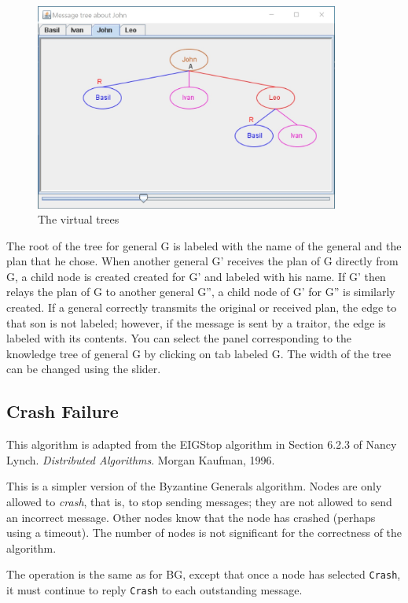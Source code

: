 \documentclass[11pt]{article}
\newcommand{\p}[1]{\texttt{#1}}
\begin{document}
\begin{figure}[htb]
\begin{center}
\includegraphics[width=10cm,keepaspectratio=true]{tree.jpg}
\end{center}
\caption{The virtual trees}\label{fig3}
\end{figure}

The root of the tree for general G is labeled with the name
of the general and the plan that he chose.
When another general G' receives the plan of G directly from G,
a child node is created created for G' and labeled with his name.
If G' then relays the plan of G to another general G'',
a child node of G' for G'' is similarly created.
If a general correctly transmits the original or received plan,
the edge to that son is not labeled;
however, if the message is sent by a traitor, the edge is labeled with its contents.
You can select the panel corresponding to the
knowledge tree of general G by clicking on tab labeled G.
The width of the tree can be changed using the slider.

\subsection{Crash Failure}

This algorithm is adapted from the EIGStop algorithm in Section 6.2.3 of
Nancy Lynch. \emph{Distributed Algorithms}. Morgan Kaufman, 1996.

This is a simpler version of the Byzantine Generals algorithm.
Nodes are only allowed to \emph{crash}, that is, to stop sending
messages; they are not allowed to send an incorrect message.
Other nodes know that the node has crashed (perhaps using a
timeout). The number of nodes is not significant for the
correctness of the algorithm.

The operation is the same as for BG, except that once a node has
selected \p{Crash}, it must continue to reply \p{Crash} to each
outstanding message.
\end{document}
